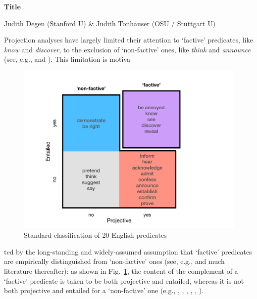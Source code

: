 \documentclass[12pt,fleqn]{article}
\newcommand{\6}{\mbox{$[\hspace*{-.6mm}[$}}
\newcommand{\9}{\mbox{$]\hspace*{-.6mm}]$}}
\begin{document}
 
 
\begin{center}
{\bf Title}

Judith Degen (Stanford U) \& Judith Tonhauser (OSU / Stuttgart U)
\end{center}

\vspace*{-.2cm}

\noindent
Projection analyses have largely limited their attention to `factive' predicates, like {\em know} and {\em discover}, to the exclusion of `non-factive' ones, like {\em think} and {\em announce} (see, e.g., \citealt{heim83,vds92,abrusan2011,abrusan2016,romoli2015} and \citealt{best-question}). This limitation is motiva-

\begin{figure}
\centering
  \includegraphics[trim={3.5cm 1cm 7cm 2cm},clip,width=.27\paperwidth]{../paper/figures/categorization}
  \caption{Standard classification of 20 English predicates}\label{f-cat}
\end{figure} 

\noindent
ted by the long-standing and widely-assumed assumption that `factive' predicates are empirically distinguished from `non-factive' ones (see, e.g.,\citealt{karttunen71b,kiparsky-kiparsky71} and much literature thereafter):  as shown in Fig.\ \ref{f-cat}, the content of the complement of a `factive' predicate is taken to be both projective and entailed, whereas it is not both projective and entailed for a `non-factive' one (e.g., \citealt{gazdar79a}, \citealt{ccmg90}, \citealt{vds92},  \citealt{schlenker10}, \citealt{anand-hacquard2014}, \citealt{spector-egre2015}). 
\end{document}

